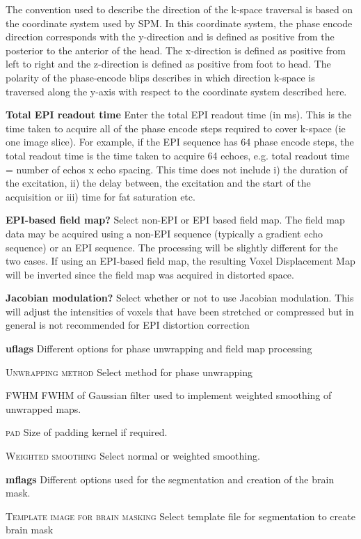 The convention used to describe the direction of the k-space traversal is based on the coordinate system used by SPM. In this coordinate system, the phase encode direction corresponds with the y-direction and is defined as positive from the posterior to the anterior of the head. The x-direction is defined as positive from left to right and the z-direction is defined as positive from foot to head. The polarity of the phase-encode blips describes in which direction k-space is traversed along the y-axis with respect to the coordinate system described here. 

\textbf{Total EPI readout time}
Enter the total EPI readout time (in ms). This is the time taken to acquire all of the phase encode steps required to cover k-space (ie one image slice). For example, if the EPI sequence has 64 phase encode steps, the total readout time is the time taken to acquire 64 echoes, e.g. total readout time = number of echos x echo spacing. This time does not include i) the duration of the excitation, ii) the delay between, the excitation and the start of the acquisition or iii) time for fat saturation etc.


\textbf{EPI-based field map?}
Select non-EPI or EPI based field map. The field map data may be acquired using a non-EPI sequence (typically a gradient echo sequence) or an EPI sequence. The processing will be slightly different for the two cases. If using an EPI-based field map, the resulting Voxel Displacement Map will be inverted since the field map was acquired in distorted space.


\textbf{Jacobian modulation?}
Select whether or not to use Jacobian modulation. This will adjust the intensities of voxels that have been stretched or compressed but in general is not recommended for EPI distortion correction


\textbf{uflags}
Different options for phase unwrapping and field map processing


\textsc{Unwrapping method}
Select method for phase unwrapping


\textsc{FWHM}
FWHM of Gaussian filter used to implement weighted smoothing of unwrapped maps.


\textsc{pad}
Size of padding kernel if required.


\textsc{Weighted smoothing}
Select normal or weighted smoothing.


\textbf{mflags}
Different options used for the segmentation and creation of the brain mask.


\textsc{Template image for brain masking}
Select template file for segmentation to create brain mask


